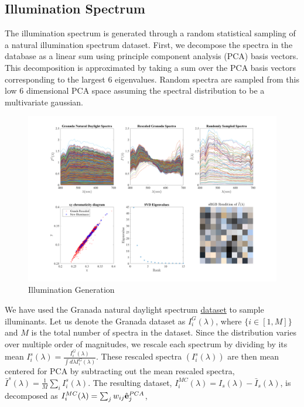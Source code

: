 \documentclass{jov}
\begin{document}
\subsection{Illumination Spectrum}
The illumination spectrum is generated through a random statistical sampling of a natural illumination spectrum dataset. First, we decompose the spectra in the database as a linear sum using principle component analysis (PCA) basis vectors. This decomposition is approximated by taking a sum over the PCA basis vectors corresponding to the largest 6 eigenvalues. Random spectra are sampled from this low 6 dimensional PCA space assuming the spectral distribution to be a multivariate gaussian.

\begin{figure}
\centering
	\includegraphics[width=\textwidth]{Figure14/illumination.pdf}
    \caption{Illumination Generation}
    \label{fig:illuminationGeneration}
\end{figure}
We have used the Granada natural daylight spectrum \href{http://colorimaginglab.ugr.es/pages/Data}{dataset} \cite{peyvandi2016colorimetric} to sample illuminants. Let us denote the Granada dataset as $I^G_i(\lambda)$, where $\{i \in [1,M]\}$ and $M$ is the total number of spectra in the dataset. Since the distribution varies over multiple order of magnitudes, we rescale each spectrum by dividing by its mean $I_i^s(\lambda) = \frac{I^G_i(\lambda)}{\int d\lambda I^G_i(\lambda)}$. These rescaled spectra $(I_i^s(\lambda))$ are then mean centered for PCA by subtracting out the mean 
rescaled spectra, $\bar{I}^{s}(\lambda) = \frac{1}{M}\sum_i{I_i^s(\lambda)}$. 
The resulting dataset, $I_i^{MC}(\lambda) = I_{s}(\lambda) - \bar{I}_{s}(\lambda)$, 
is decomposed as $I_i^{MC}(\lambda) = \sum_j w_{ij}\hat{{\bf e}}_j^{PCA}$, 
\end{document}
